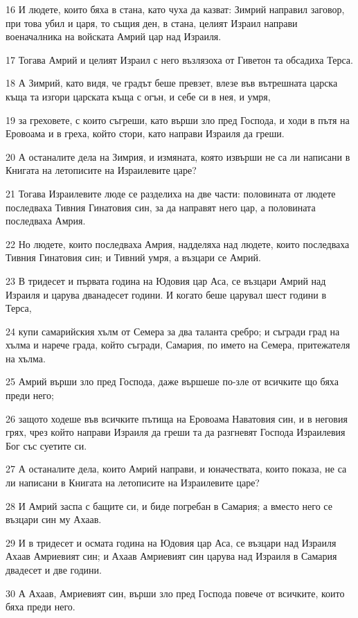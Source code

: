 \par 16 И людете, които бяха в стана, като чуха да казват: Зимрий направил заговор, при това убил и царя, то същия ден, в стана, целият Израил направи военачалника на войската Амрий цар над Израиля.
\par 17 Тогава Амрий и целият Израил с него възлязоха от Гиветон та обсадиха Терса.
\par 18 А Зимрий, като видя, че градът беше превзет, влезе във вътрешната царска къща та изгори царската къща с огън, и себе си в нея, и умря,
\par 19 за греховете, с които съгреши, като върши зло пред Господа, и ходи в пътя на Еровоама и в греха, който стори, като направи Израиля да греши.
\par 20 А останалите дела на Зимрия, и измяната, която извърши не са ли написани в Книгата на летописите на Израилевите царе?
\par 21 Тогава Израилевите люде се разделиха на две части: половината от людете последваха Тивния Гинатовия син, за да направят него цар, а половината последваха Амрия.
\par 22 Но людете, които последваха Амрия, надделяха над людете, които последваха Тивния Гинатовия син; и Тивний умря, а възцари се Амрий.
\par 23 В тридесет и първата година на Юдовия цар Аса, се възцари Амрий над Израиля и царува дванадесет години. И когато беше царувал шест години в Терса,
\par 24 купи самарийския хълм от Семера за два таланта сребро; и съгради град на хълма и нарече града, който съгради, Самария, по името на Семера, притежателя на хълма.
\par 25 Амрий върши зло пред Господа, даже вършеше по-зле от всичките що бяха преди него;
\par 26 защото ходеше във всичките пътища на Еровоама Наватовия син, и в неговия грях, чрез който направи Израиля да греши та да разгневят Господа Израилевия Бог със суетите си.
\par 27 А останалите дела, които Амрий направи, и юначествата, които показа, не са ли написани в Книгата на летописите на Израилевите царе?
\par 28 И Амрий заспа с бащите си, и биде погребан в Самария; а вместо него се възцари син му Ахаав.
\par 29 И в тридесет и осмата година на Юдовия цар Аса, се възцари над Израиля Ахаав Амриевият син; и Ахаав Амриевият син царува над Израиля в Самария двадесет и две години.
\par 30 А Ахаав, Амриевият син, върши зло пред Господа повече от всичките, които бяха преди него.
